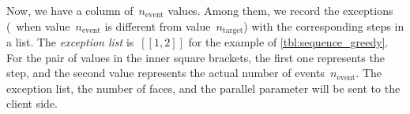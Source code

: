 \documentclass[]{interact}
\begin{document}

Now, we have a column of~$n_\mathrm{event}$ values.
Among them, we record the exceptions 
(\ie~when value~$n_\mathrm{event}$ is different from value~$n_\mathrm{target}$) 
with the corresponding steps in a list.
The \emph{exception list} is~$[[1, 2]]$ for the example of \tabl\ref{tbl:sequence_greedy}.
For the pair of values in the inner square brackets,
the first one represents the step,
and the second value represents the actual number of events~$n_\mathrm{event}$.
The exception list, the number of faces, and the parallel parameter 
will be sent to the client side.
 
\end{document}
